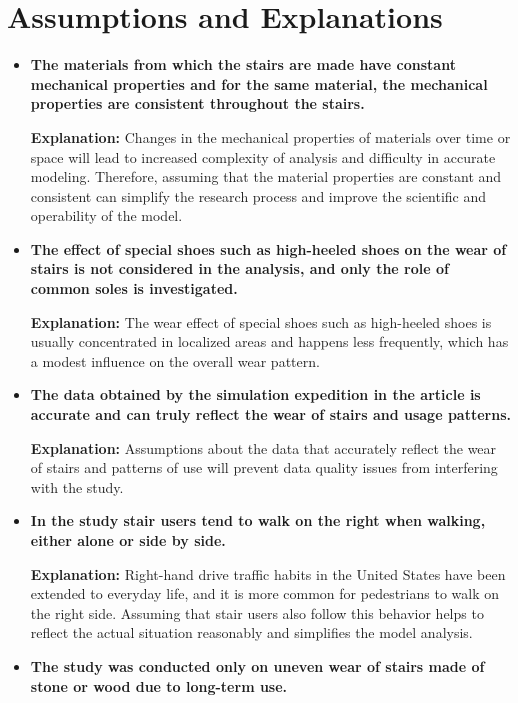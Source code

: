 \documentclass{mcmthesis}
\begin{document}
\section{Assumptions and Explanations}
\begin{itemize}

\item \textbf{The materials from which the stairs are made have constant mechanical properties and for the same material, the mechanical properties are consistent throughout the stairs.}

\textbf{Explanation:}
Changes in the mechanical properties of materials over time or space will lead to increased complexity of analysis and difficulty in accurate modeling. Therefore, assuming that the material properties are constant and consistent can simplify the research process and improve the scientific and operability of the model.

\item \textbf{The effect of special shoes such as high-heeled shoes on the wear of stairs is not considered in the analysis, and only the role of common soles is investigated.}

\textbf{Explanation:}
The wear effect of special shoes such as high-heeled shoes is usually concentrated in localized areas and happens less frequently, which has a modest influence on the overall wear pattern.

\item \textbf{The data obtained by the simulation expedition in the article is accurate and can truly reflect the wear of stairs and usage patterns.}

\textbf{Explanation:}
Assumptions about the data that accurately reflect the wear of stairs and patterns of use will prevent data quality issues from interfering with the study.

\item \textbf{In the study stair users tend to walk on the right when walking, either alone or side by side.}

\textbf{Explanation:}
Right-hand drive traffic habits in the United States have been extended to everyday life, and it is more common for pedestrians to walk on the right side. Assuming that stair users also follow this behavior helps to reflect the actual situation reasonably and simplifies the model analysis.

\item \textbf{The study was conducted only on uneven wear of stairs made of stone or wood due to long-term use.}


\end{itemize}
\end{document}
